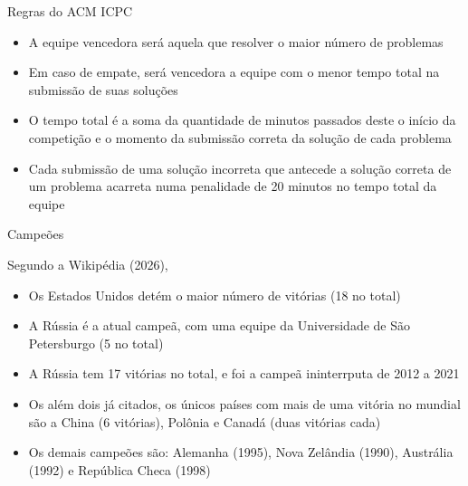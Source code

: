 \begin{frame}[fragile]{Regras do ACM ICPC}

    \begin{itemize}
        \item A equipe vencedora será aquela que resolver o maior número de problemas
        \item Em caso de empate, será vencedora a equipe com o menor tempo total na
        submissão de suas soluções
        \item O tempo total é a soma da quantidade de minutos passados deste o início da
        competição e o momento da submissão correta da solução de cada problema
        \item Cada submissão de uma solução incorreta que antecede a
        solução correta de um problema acarreta numa penalidade de 20 minutos no tempo total da
        equipe
    \end{itemize}

\end{frame}

\begin{frame}[fragile]{Campeões}

    Segundo a Wikipédia (2026),

    \begin{itemize}
        \item Os Estados Unidos detém o maior número de vitórias (18 no total)
        \item A Rússia é a atual campeã, com uma equipe da Universidade de São Petersburgo (5 no total)
        \item A Rússia tem 17 vitórias no total, e foi a campeã ininterrputa de 2012 a 2021 
        \item Os além dois já citados, os únicos países com mais de uma vitória no mundial são
            a China (6 vitórias), Polônia e Canadá (duas vitórias cada)
        \item Os demais campeões são: Alemanha (1995), Nova Zelândia (1990), Austrália (1992)  e
            República Checa (1998)
    \end{itemize}

\end{frame}

